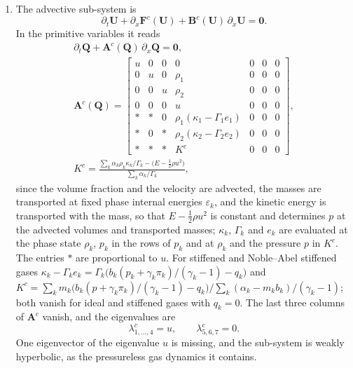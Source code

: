 \begin{enumerate}
\item The advective sub-system is
\begin{equation}
\partial_t\mathbf U+\partial_x\mathbf F^c(\mathbf U)+\mathbf B^c(\mathbf U)\,\partial_x\mathbf U=\mathbf 0 .
\label{eq:advective}
\end{equation}
In the primitive variables it reads
\begin{equation}
\begin{gathered}
\partial_t\mathbf Q+\mathbf A^c(\mathbf Q)\,\partial_x\mathbf Q=\mathbf 0,\\
\mathbf A^c(\mathbf Q)=\begin{bmatrix}
u&0&0&0&0&0&0\\
0&u&0&\rho_1&0&0&0\\
0&0&u&\rho_2&0&0&0\\
0&0&0&u&0&0&0\\
\ast&\ast&0&\rho_1(\kappa_1-\Gamma_1e_1)&0&0&0\\
\ast&0&\ast&\rho_2(\kappa_2-\Gamma_2e_2)&0&0&0\\
\ast&\ast&\ast&K^c&0&0&0
\end{bmatrix},\\
K^c=\frac{\sum_k\alpha_k\rho_k\kappa_k/\Gamma_k-\big(E-\tfrac12\rho u^2\big)}{\sum_k\alpha_k/\Gamma_k},
\end{gathered}
\label{eq:Ac}
\end{equation}
since the volume fraction and the velocity are advected, the masses are transported at fixed phase internal energies
$\varepsilon_k$, and the kinetic energy is transported with the mass, so that $E-\tfrac12\rho u^2$ is constant and determines $p$ at the
advected volumes and transported masses; $\kappa_k$, $\Gamma_k$ and $e_k$ are evaluated at the phase state $\rho_k$, $p_k$ in the rows of $p_k$
and at $\rho_k$ and the pressure $p$ in $K^c$. The entries $\ast$ are proportional to $u$. For stiffened and Noble--Abel stiffened gases $\kappa_k-\Gamma_ke_k=\Gamma_k\big(b_k(p_k+\gamma_k\pi_k)/(\gamma_k-1)-q_k\big)$ and
$K^c=\sum_km_k\big(b_k(p+\gamma_k\pi_k)/(\gamma_k-1)-q_k\big)\big/\sum_k(\alpha_k-m_kb_k)/(\gamma_k-1)$; both vanish for ideal and stiffened gases
with $q_k=0$. The last three columns of $\mathbf A^c$ vanish, and the eigenvalues are
\begin{equation}
\lambda^c_{1,\dots,4}=u,\qquad \lambda^c_{5,6,7}=0 .
\label{eq:eig_adv}
\end{equation}
One eigenvector of the eigenvalue $u$ is missing, and the sub-system is weakly hyperbolic, as the pressureless gas dynamics it contains.

\end{enumerate}
